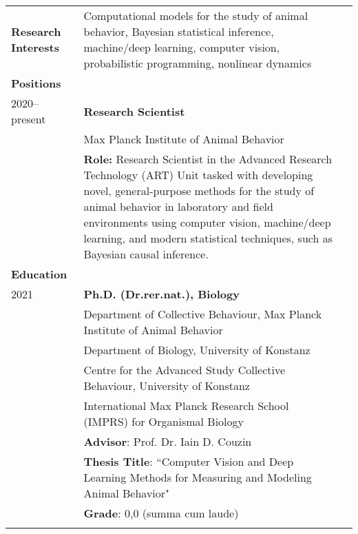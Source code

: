 \documentclass[letterpaper,10pt,oneside]{article}
\begin{document}
\begin{small}
\noindent \begin{longtable}{@{} l p{5.3in}l}

\large{\textbf{Research Interests}}
& Computational models for the study of animal behavior, Bayesian statistical inference, machine/deep learning, computer vision, probabilistic programming, nonlinear dynamics \vspace{2mm}\\ 

\Large{\textbf{Positions}} \vspace{5mm} \\
\large{2020--present} 
& \textbf{Research Scientist} \\
& {Max Planck Institute of Animal Behavior} \vspace{1mm}\\
& \textbf{Role:} Research Scientist in the Advanced Research Technology (ART) Unit tasked with developing novel, general-purpose methods for the study of animal behavior in laboratory and field environments using computer vision, machine/deep learning, and modern statistical techniques, such as Bayesian causal inference. \\

\Large{\textbf{Education}} \vspace{5mm} \\
 \large{2021} 
 & \textbf{Ph.D.  (Dr.rer.nat.), Biology} \\

 & {Department of Collective Behaviour, Max Planck Institute of Animal Behavior} \\
  & {Department of Biology, University of Konstanz} \\
    & {Centre for the Advanced Study Collective Behaviour, University of Konstanz} \\
 	& {International Max Planck Research School (IMPRS) for Organismal Biology} \vspace{1mm} \\
     &\textbf{Advisor}: Prof. Dr. Iain D. Couzin\\
     &\textbf{Thesis Title}: ``Computer Vision and Deep Learning Methods for Measuring and Modeling Animal Behavior" \\
      & \textbf{Grade}: 0,0 (summa cum laude) \\
     &  \vspace{5mm}\\
     

\end{longtable}
\end{small}
\end{document}
